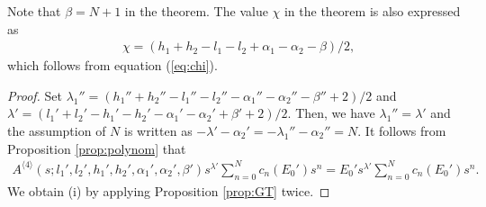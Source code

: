 \documentclass[12pt]{amsart}
\numberwithin{equation}{section}
\theoremstyle{definition}
\theoremstyle{remark}
\begin{document}
Note that $\beta = N+1 $ in the theorem.
The value $\chi $ in the theorem is also expressed as
\begin{align*}
    & \chi = (h_{1} + h_{2} - l_{1} - l_{2} + \alpha_{1} - \alpha_{2} - \beta )/2 ,
\end{align*}
which follows from equation (\ref{eq:chi}).
\begin{proof}
Set $\lambda_{1}'' = (h_{1}'' + h_{2}'' - l_{1}'' - l_{2}'' - \alpha_{1}'' - \alpha_{2}'' - \beta'' + 2)/2$ and $\lambda ' = (l_{1}' + l_{2}' - h_{1}' - h_{2}' - \alpha_{1}' - \alpha_{2}' + \beta' + 2)/2$.
Then, we have $\lambda_{1}'' = \lambda ' $ and the assumption of $N$ is written as $-\lambda ' - \alpha_{2}' = - \lambda_{1}''  - \alpha_{2}'' =N$.
It follows from Proposition \ref{prop:polynom} that
  \begin{align*}
  A^{\langle 4 \rangle} (s; l_{1}', l_{2}', h_{1}', h_{2}', \alpha_{1}', \alpha_{2}', \beta') s^{\lambda '} \sum_{n = 0}^{N} c_{n}(E_{0}')s^{n} = E_{0}' s^{\lambda '} \sum_{n = 0}^{N} c_{n} (E_{0}') s^{n} .
  \end{align*}
We obtain (i) by applying Proposition \ref{prop:GT} twice.


\end{proof}
\end{document}
